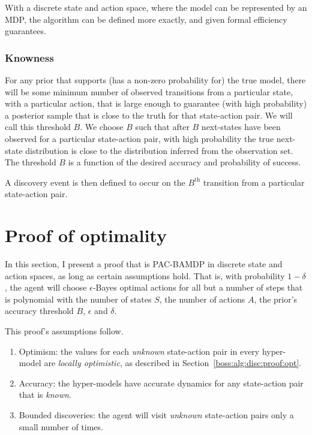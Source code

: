 With a discrete state and action space, where the model can be represented by an MDP, the  algorithm can be defined more exactly, and given formal efficiency guarantees.

\subsubsection{Knowness}

For any prior that supports (has a non-zero probability for) the true model, there will be some minimum number of observed transitions from a particular state, with a particular action, that is large enough to guarantee (with high probability) a posterior sample that is close to the truth for that state-action pair. We will call this threshold $B$. We choose $B$ such that after $B$ next-states have been observed for a particular state-action pair, with high probability the true next-state distribution is close to the distribution inferred from the observation set. The threshold $B$ is a function of the desired accuracy and probability of success.

A discovery event is then defined to occur on the $B^{\mbox{th}}$ transition from a particular state-action pair.

\section{Proof of optimality}
\label{boss:alg:disc:proof}

In this section, I present a proof that  is PAC-BAMDP in discrete state and action spaces, as long as certain assumptions hold. That is, with probability $1-\delta$, the agent will choose $\epsilon$-Bayes optimal actions for all but a number of steps that is polynomial with the number of states $S$, the number of actions $A$, the prior's accuracy threshold $B$, $\epsilon$ and $\delta$.

This proof's assumptions follow.
\begin{enumerate}
\item
\label{boss:alg:disc:proof:cond:opt}
Optimism: the values for each \emph{unknown} state-action pair in every hyper-model are \emph{locally optimistic}, as described in Section~\ref{boss:alg:disc:proof:opt}.
\item
\label{boss:alg:disc:proof:cond:acc}
Accuracy: the hyper-models have accurate dynamics for any state-action pair that is \emph{known}.
\item
\label{boss:alg:disc:proof:cond:disc}
Bounded discoveries: the agent will visit \emph{unknown} state-action pairs only a small number of times.
\end{enumerate}

